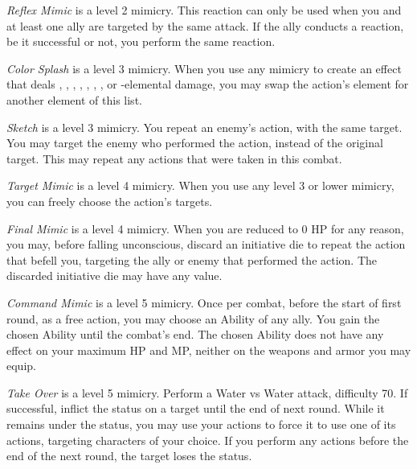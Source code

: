 \begin{multicols}{2}
	\textit{Reflex Mimic} is a level 2 mimicry. This reaction can only be used when you and at least one ally are targeted by the same attack. If the ally conducts a reaction, be it successful or not, you perform the same reaction.
    
    \textit{Color Splash} is a level 3 mimicry. When you use any mimicry to create an effect that deals , , , , , , ,  or -elemental damage, you may swap the action’s element for another element of this list.
    
    \textit{Sketch} is a level 3 mimicry. You repeat an enemy’s action, with the same target. You may target the enemy who performed the action, instead of the original target. This may repeat any actions that were taken in this combat.
    
    \textit{Target Mimic} is a level 4 mimicry. When you use any level 3 or lower mimicry, you can freely choose the action’s targets.
	
	\textit{Final Mimic} is a level 4 mimicry. When you are reduced to 0 HP for any reason, you may, before falling unconscious, discard an initiative die to repeat the action that befell you, targeting the ally or enemy that performed the action.  The discarded initiative die may have any value.
    
    \textit{Command Mimic} is a level 5 mimicry. Once per combat, before the start of first round, as a free action, you may choose an Ability of any ally. You gain the chosen Ability until the combat’s end. The chosen Ability does not have any effect on your maximum HP and MP, neither on the weapons and armor you may equip.
    
    \textit{Take Over} is a level 5 mimicry. Perform a Water vs Water attack, difficulty 70. If successful, inflict the  status on a target until the end of next round. While it remains under the  status, you may use your actions to force it to use one of its actions, targeting characters of your choice. If you perform any actions before the end of the next round, the target loses the  status.

    \begin{center}
    \end{center}
\end{multicols}